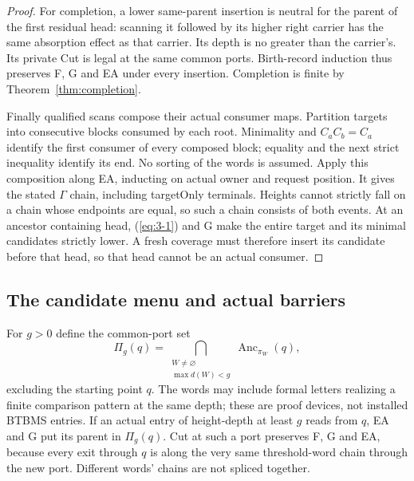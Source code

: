 \begin{proof}
For completion, a lower same-parent insertion is neutral for the
parent of the first residual head: scanning it followed by its higher
right carrier has the same absorption effect as that carrier. Its
depth is no greater than the carrier's. Its private Cut is legal at
the same common ports. Birth-record induction thus preserves F, G
and EA under every insertion. Completion is finite by
Theorem~\ref{thm:completion}.

Finally qualified scans compose their actual consumer maps. Partition
targets into consecutive blocks consumed by each root. Minimality and
$C_aC_b=C_a$ identify the first consumer of every composed block;
equality and the next strict inequality identify its end. No sorting
of the words is assumed. Apply this composition along EA, inducting
on actual owner and request position. It gives the stated $\Gamma$
chain, including targetOnly terminals. Heights cannot strictly fall
on a chain whose endpoints are equal, so such a chain consists of both
events. At an ancestor containing head, (\ref{eq:3-1}) and G make the entire
target and its minimal candidates strictly lower. A fresh coverage
must therefore insert its candidate before that head, so that head
cannot be an actual consumer. 
\end{proof}

\subsection{The candidate menu and actual barriers}
For $g>0$ define the common-port set
\[
 \Pi_g(q)=\bigcap_{\substack{W\ne\varnothing\\\max d(W)<g}}
           \operatorname{Anc}_{\pi_W}(q),
\]
excluding the starting point $q$. The words may include formal letters
realizing a finite comparison pattern at the same depth; these are
proof devices, not installed BTBMS entries. If an actual entry of
height-depth at least $g$ reads from $q$, EA and G put its parent in
$\Pi_g(q)$. Cut at such a port preserves F, G and EA, because every
exit through $q$ is along the very same threshold-word chain through
the new port. Different words' chains are not spliced together.

